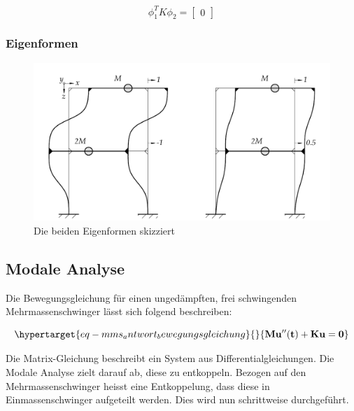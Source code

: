 \documentclass[
  letterpaper,
  DIV=11]{scrreprt}
\begin{document}
\begin{equation}\phi_{1}^{T} K \phi_{2} = \left[\begin{matrix}0\end{matrix}\right]\end{equation}

\hypertarget{eigenformen-2}{%
\subsubsection{Eigenformen}\label{eigenformen-2}}

\begin{figure}[H]

{\centering \includegraphics{index_files/mediabag/bilder/aufgabe_mms_steif_eigenvektoren.pdf}

}

\caption{\label{fig-mms_antwort_eigenformen}Die beiden Eigenformen
skizziert}

\end{figure}

\hypertarget{modale-analyse-2}{%
\subsection{Modale Analyse}\label{modale-analyse-2}}

Die Bewegungsgleichung für einen ungedämpften, frei schwingenden
Mehrmassenschwinger lässt sich folgend beschreiben:

\begin{equation}\protect\hypertarget{eq-mms_antwort_bewegungsgleichung}{}{
\mathbf{M u''(t) + K u = 0}
}\label{eq-mms_antwort_bewegungsgleichung}\end{equation}

Die Matrix-Gleichung beschreibt ein System aus Differentialgleichungen.
Die Modale Analyse zielt darauf ab, diese zu entkoppeln. Bezogen auf den
Mehrmassenschwinger heisst eine Entkoppelung, dass diese in
Einmassenschwinger aufgeteilt werden. Dies wird nun schrittweise
durchgeführt.
\end{document}
